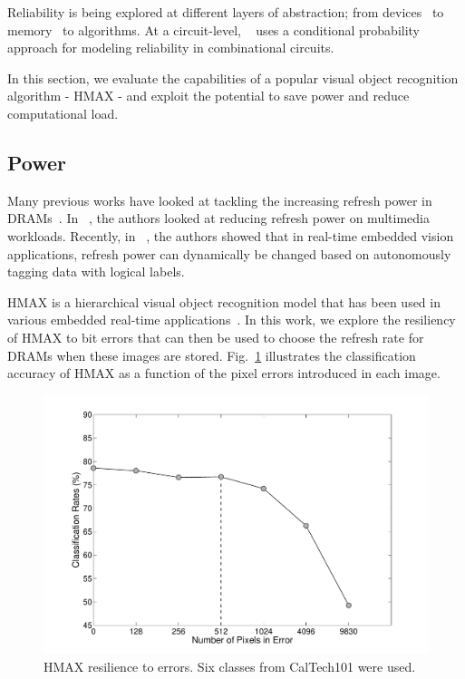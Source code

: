 
Reliability is being explored at different layers of abstraction; from devices~\cite{Datta2014,Datta2015,Rahul2015} to memory~\cite{isca2014} to algorithms.
At a circuit-level, ~\cite{chen2015fast} uses a conditional probability approach for modeling reliability in combinational circuits.

In this section, we evaluate the capabilities of a popular visual object recognition algorithm - HMAX - and exploit the potential to save 
power and reduce computational load.

\subsection{Power}
Many previous works have looked at tackling the increasing refresh power in DRAMs~\cite{Liu2012, Stuecheli2010}. In ~\cite{Liu2011}, the 
authors looked at reducing refresh power on multimedia workloads. Recently, in ~\cite{iccd2014}, the authors showed that in 
real-time embedded vision applications, refresh power can dynamically be changed based on autonomously tagging data with logical labels.

HMAX is a hierarchical visual object recognition model that has been used in various embedded real-time applications~\cite{Kestur2012, Maashri2012a}. In this work, we explore the resiliency of HMAX to bit errors that can then be used to choose the refresh rate for DRAMs when these images are stored.  
Fig.~\ref{fig:hmax_pixel_sensitivity} illustrates the classification accuracy of HMAX as a function of the pixel errors introduced in each image.

\begin{figure}[htb!]
\vspace{0pt}
\centering
\includegraphics[width=0.99\linewidth,trim={20 20 30 20}, clip]{./figures/PixelSensitivityAnalysis.pdf}
\vspace{0pt}
\caption{HMAX resilience to errors. Six classes from CalTech101 were used.}\label{fig:hmax_pixel_sensitivity}
\vspace{0pt}
\end{figure}

